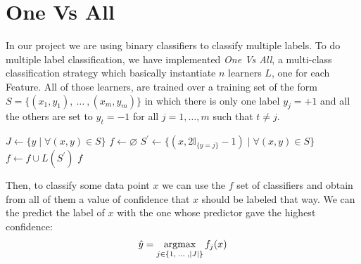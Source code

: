 
\chapter{One Vs All}
In our project we are using binary classifiers to classify multiple labels. To do multiple label classification, we have implemented \textit{One Vs All}, a multi-class classification strategy which basically instantiate $n$ learners $L$, one for each Feature. All of those learners, are trained over a training set of the form $S=\lbrace (x_{1},y_{1}),\:\dots\:,(x_{m},y_{m}) \rbrace$ in which there is only one label $y_{j}=+1$ and all the others are set to $y_{t}=-1$ for all $j = 1,\dots,m$ such that $t \neq j$.

\begin{algorithm}[htpb]
	\caption{}
	\label{alg:dstumps}
	\begin{algorithmic}[1]
		\State $J \gets \lbrace y\; |\; \forall(x,y)\in S\rbrace$
		\State $f \gets \varnothing $
			\State $S^{\prime} \gets \lbrace (x, 2\mathbb{I}_{\lbrace y = j \rbrace} -1) \; |\; \forall(x, y)\in S \rbrace$
			\State $f \gets f \cup L(S^{\prime})$
		\EndFor
		\Return $f$
		\EndProcedure
	\end{algorithmic}
\end{algorithm}
Then, to classify some data point $x$ we can use the $f$ set of classifiers and obtain from all of them a value of confidence that $x$ should be labeled that way. We can the predict the label of $x$ with the one whose predictor gave the highest confidence:
\begin{align*}
	\hat{y}=\operatorname*{argmax}_{j\in\lbrace 1,\;\dots\;, |J|\rbrace} f_{j}(x)
\end{align*} 

















